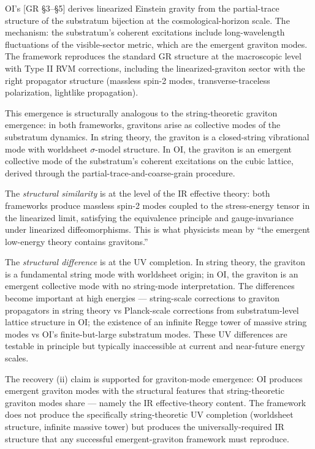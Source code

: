 \documentclass[
]{article}
\begin{document}
OI's {[}GR §3--§5{]} derives linearized Einstein gravity from the
partial-trace structure of the substratum bijection at the
cosmological-horizon scale. The mechanism: the substratum's coherent
excitations include long-wavelength fluctuations of the visible-sector
metric, which are the emergent graviton modes. The framework reproduces
the standard GR structure at the macroscopic level with Type II RVM
corrections, including the linearized-graviton sector with the right
propagator structure (massless spin-2 modes, transverse-traceless
polarization, lightlike propagation).

This emergence is structurally analogous to the string-theoretic
graviton emergence: in both frameworks, gravitons arise as collective
modes of the substratum dynamics. In string theory, the graviton is a
closed-string vibrational mode with worldsheet \(\sigma\)-model
structure. In OI, the graviton is an emergent collective mode of the
substratum's coherent excitations on the cubic lattice, derived through
the partial-trace-and-coarse-grain procedure.

The \emph{structural similarity} is at the level of the IR effective
theory: both frameworks produce massless spin-2 modes coupled to the
stress-energy tensor in the linearized limit, satisfying the equivalence
principle and gauge-invariance under linearized diffeomorphisms. This is
what physicists mean by ``the emergent low-energy theory contains
gravitons.''

The \emph{structural difference} is at the UV completion. In string
theory, the graviton is a fundamental string mode with worldsheet
origin; in OI, the graviton is an emergent collective mode with no
string-mode interpretation. The differences become important at high
energies --- string-scale corrections to graviton propagators in string
theory vs Planck-scale corrections from substratum-level lattice
structure in OI; the existence of an infinite Regge tower of massive
string modes vs OI's finite-but-large substratum modes. These UV
differences are testable in principle but typically inaccessible at
current and near-future energy scales.

The recovery (ii) claim is supported for graviton-mode emergence: OI
produces emergent graviton modes with the structural features that
string-theoretic graviton modes share --- namely the IR effective-theory
content. The framework does not produce the specifically
string-theoretic UV completion (worldsheet structure, infinite massive
tower) but produces the universally-required IR structure that any
successful emergent-graviton framework must reproduce.
\end{document}
